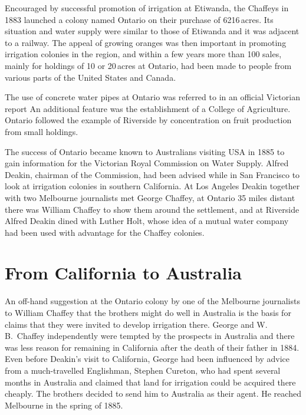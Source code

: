 Encouraged by successful promotion of irrigation at Etiwanda, the
Chaffeys in 1883 laun\-ch\-ed a colony named Ontario
 on their purchase of
6216\,acres.  Its situation and water supply were similar to those of
Etiwanda and it was adjacent to a railway.
The appeal of growing oranges was then important in
promoting irrigation colonies in the region, and within a few years
more than 100 sales, mainly for holdings of 10 or 20\,acres at
Ontario, had been made to people from various parts of the United
States and Canada.

The use of concrete water pipes at Ontario was referred to in an
official Victorian report An additional feature was the establishment
of a College of Agriculture.  Ontario followed the example of
Riverside by concentration on fruit production from small
holdings.

The success of Ontario became known to Australians visiting
USA in 1885 to gain information for the Victorian Royal
Commission on Water Supply. Alfred Deakin,   chairman of the Commission,
had been advised while in San Francisco to look at irrigation colonies
in southern California.  At Los Angeles Deakin
together with two Melbourne journalists met George Chaffey, at Ontario
35 miles distant there was William Chaffey to show them around the
settlement, and at Riverside Alfred Deakin dined with Luther Holt,
  whose idea of a mutual water company had been used
with advantage for the Chaffey colonies.

\section*{From California to Australia}

An off-hand suggestion at the Ontario colony by one of the Melbourne
journalists to William Chaffey that the brothers might do well in
Australia is the basis for claims that they were invited to develop
irrigation there.  George and W.\,B.~Chaffey independently were
tempted by the prospects in Australia and there was less reason for
remaining in California after the death of their father in 1884.  Even
before Deakin's visit to California, George had been influenced by
advice from a much-travelled Englishman, Stephen Cureton,
 who had
spent several months in Australia and claimed that land for irrigation
could be acquired there cheaply.  The brothers decided to send him to
Australia as their agent.  He reached Melbourne in the spring of
1885.

